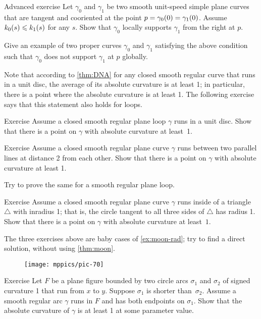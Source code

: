 \begin{thm}{Advanced exercise}\label{ex:support}
Let $\gamma_0$ and $\gamma_1$ be two smooth unit-speed simple plane curves that are tangent and cooriented at the point $p\z=\gamma_0(0)\z=\gamma_1(0)$.
Assume $k_0(s)\leqslant k_1(s)$ for any $s$.
Show that $\gamma_0$ locally supports $\gamma_1$ from the right at $p$.

Give an example of two proper curves $\gamma_0$ and $\gamma_1$ satisfying the above condition such that $\gamma_0$ does not support $\gamma_1$ at $p$ globally.
\end{thm}

Note that according to \ref{thm:DNA} for any closed smooth regular curve that runs in a unit disc, the average of its absolute curvature is at least 1; in particular, there is a point where the absolute curvature is at least 1.
The following exercise says that this statement also holds for loops.

\begin{thm}{Exercise}\label{ex:in-circle}
Assume a closed smooth regular plane loop $\gamma$ runs in a unit disc.
Show that there is a point on $\gamma$ with absolute curvature at least~1.
\end{thm}


\begin{thm}{Exercise}\label{ex:between-parallels-1}
Assume a closed smooth regular plane curve $\gamma$ runs between two parallel lines at distance 2 from each other.
Show that there is a point on $\gamma$ with absolute curvature at least 1.

Try to prove the same for a smooth regular plane loop.
\end{thm}

\begin{thm}{Exercise}\label{ex:in-triangle}
Assume a closed smooth regular plane curve $\gamma$ runs inside of a triangle $\triangle$ with inradius 1; that is, the circle tangent to all three sides of $\triangle$ has radius 1. 
Show that there is a point on $\gamma$ with absolute curvature at least~$1$.
\end{thm}

The three exercises above are baby cases of \ref{ex:moon-rad}; try to find a direct solution, without using \ref{thm:moon}.

{

\begin{wrapfigure}{o}{32 mm}
\vskip-4mm
\centering
\texttt{[image: mppics/pic-70]}
\vskip0mm
\end{wrapfigure}

\begin{thm}{Exercise}\label{ex:lens}
Let $F$ be a plane figure bounded by two circle arcs $\sigma_1$ and $\sigma_2$ of signed curvature 1 that run from $x$ to $y$.
Suppose $\sigma_1$ is shorter than~$\sigma_2$.
Assume a smooth regular arc $\gamma$ runs in $F$ and has both endpoints on $\sigma_1$.
Show that the absolute curvature of $\gamma$ is at least 1 at some parameter value.

\end{thm}

}

